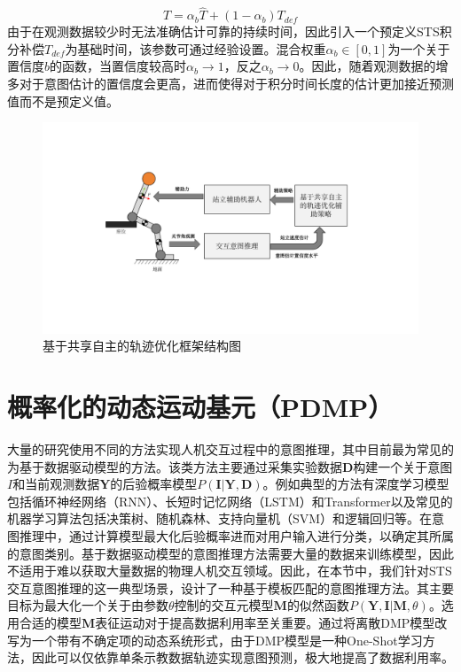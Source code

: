 \begin{equation}
    T=\alpha_b \hat T + (1-\alpha_b)T_{def}
    \label{eq:4-3}
\end{equation}
由于在观测数据较少时无法准确估计可靠的持续时间，因此引入一个预定义STS积分补偿$T_{def}$为基础时间，该参数可通过经验设置。混合权重$\alpha_b \in [0,1]$为一个关于置信度$b$的函数，当置信度较高时$\alpha_b \rightarrow 1$，反之$\alpha_b \rightarrow 0$。因此，随着观测数据的增多对于意图估计的置信度会更高，进而使得对于积分时间长度的估计更加接近预测值而不是预定义值。

\begin{figure}[!t]
    \centering\includegraphics[width=1\textwidth]{figures/4-Fig-2.pdf}
    \caption{基于共享自主的轨迹优化框架结构图}
    \label{fig:4-2}
\end{figure}

\section{概率化的动态运动基元（PDMP）} 
大量的研究使用不同的方法实现人机交互过程中的意图推理，其中目前最为常见的为基于数据驱动模型的方法。该类方法主要通过采集实验数据$\mathbf{D}$构建一个关于意图$I$和当前观测数据$\mathbf{Y}$的后验概率模型$P(\mathbf{I}|\mathbf{Y},\mathbf{D})$。例如典型的方法有深度学习模型包括循环神经网络（RNN）、长短时记忆网络（LSTM）和Transformer以及常见的机器学习算法包括决策树、随机森林、支持向量机（SVM）和逻辑回归等。在意图推理中，通过计算模型最大化后验概率进而对用户输入进行分类，以确定其所属的意图类别。基于数据驱动模型的意图推理方法需要大量的数据来训练模型，因此不适用于难以获取大量数据的物理人机交互领域。因此，在本节中，我们针对STS交互意图推理的这一典型场景，设计了一种基于模板匹配的意图推理方法。其主要目标为最大化一个关于由参数$\theta$控制的交互元模型$\mathbf{M}$的似然函数$P(\mathbf{Y},\mathbf{I}|\mathbf{M},\theta)$。选用合适的模型$\mathbf{M}$表征运动对于提高数据利用率至关重要。通过将离散DMP模型改写为一个带有不确定项的动态系统形式，由于DMP模型是一种One-Shot学习方法，因此可以仅依靠单条示教数据轨迹实现意图预测，极大地提高了数据利用率。

